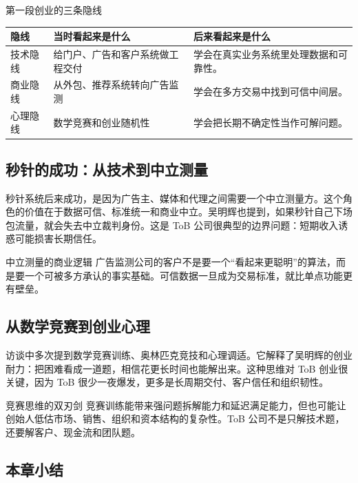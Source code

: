 \documentclass[a4paper]{article}
\begin{document}
\begin{knowledgebox}{第一段创业的三条隐线}
\begin{tabularx}{\textwidth}{p{}p{}X}
\toprule
隐线 & 当时看起来是什么 & 后来看起来是什么 \\
\midrule
技术隐线 & 给门户、广告和客户系统做工程交付 & 学会在真实业务系统里处理数据和可靠性。 \\
商业隐线 & 从外包、推荐系统转向广告监测 & 学会在多方交易中找到可信中间层。 \\
心理隐线 & 数学竞赛和创业随机性 & 学会把长期不确定性当作可解问题。 \\
\bottomrule
\end{tabularx}
\end{knowledgebox}

\subsection{秒针的成功：从技术到中立测量}

秒针系统后来成功，是因为广告主、媒体和代理之间需要一个中立测量方。这个角色的价值在于数据可信、标准统一和商业中立。吴明辉也提到，如果秒针自己下场包流量，就会失去中立裁判身份。这是 ToB 公司很典型的边界问题：短期收入诱惑可能损害长期信任。

\begin{knowledgebox}{中立测量的商业逻辑}
广告监测公司的客户不是要一个“看起来更聪明”的算法，而是要一个可被多方承认的事实基础。可信数据一旦成为交易标准，就比单点功能更有壁垒。
\end{knowledgebox}

\subsection{从数学竞赛到创业心理}

访谈中多次提到数学竞赛训练、奥林匹克竞技和心理调适。它解释了吴明辉的创业耐力：把困难看成一道题，相信花更长时间也能解出来。这种思维对 ToB 创业很关键，因为 ToB 很少一夜爆发，更多是长周期交付、客户信任和组织韧性。

\begin{warningbox}{竞赛思维的双刃剑}
竞赛训练能带来强问题拆解能力和延迟满足能力，但也可能让创始人低估市场、销售、组织和资本结构的复杂性。ToB 公司不是只解技术题，还要解客户、现金流和团队题。
\end{warningbox}

\subsection{本章小结}
\end{document}
